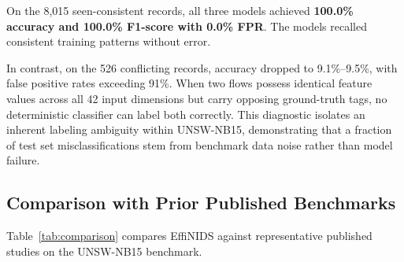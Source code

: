 \documentclass[conference]{IEEEtran}
\begin{document}
\begin{table}[htbp]
\caption{Classification Breakdown Across Consistent, Conflicting, and Unseen Subsets}
\begin{center}
\end{center}
\label{tab:consistency}
\end{table}

On the 8,015 seen-consistent records, all three models achieved \textbf{100.0\% accuracy and 100.0\% F1-score with 0.0\% FPR}. The models recalled consistent training patterns without error.

In contrast, on the 526 conflicting records, accuracy dropped to 9.1\%--9.5\%, with false positive rates exceeding 91\%. When two flows possess identical feature values across all 42 input dimensions but carry opposing ground-truth tags, no deterministic classifier can label both correctly. This diagnostic isolates an inherent labeling ambiguity within UNSW-NB15, demonstrating that a fraction of test set misclassifications stem from benchmark data noise rather than model failure.

\subsection{Comparison with Prior Published Benchmarks}
Table~\ref{tab:comparison} compares EffiNIDS against representative published studies on the UNSW-NB15 benchmark.
\end{document}
